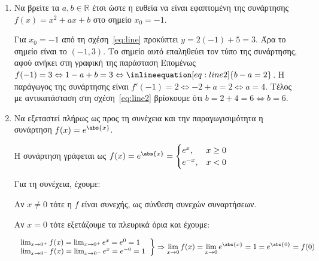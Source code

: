 



\everymath{\displaystyle}



\begin{center}
\end{center}

\vspace{\baselineskip}

\begin{enumerate}
	\item Να βρείτε τα $ a, b \in \mathbb{R} $ έτσι ώστε η ευθεία
		να είναι εφαπτομένη της συνάρτησης $ f(x) = x^{2} + ax + b $ στο
		σημείο $ x_{0} = -1 $. 


		Για $ x_{0} = -1 $ από τη σχέση~\eqref{eq:line}  προκύπτει $ y = 2(-1) + 5 =
		3$. Άρα το σημείο είναι το $ (-1,3) $. Το σημείο αυτό επαληθεύει τον
		τύπο της συνάρτησης, αφού ανήκει στη γραφική της παράσταση
		Επομένως $ f(-1) = 3 \Leftrightarrow 1 - a + b = 3
		\Leftrightarrow \inlineequation[eq:line2]{b - a = 2} $. 
		Η παράγωγος της συνάρτησης είναι $ f'(-1) = 2 \Leftrightarrow -2 + a = 2
		\Leftrightarrow a = 4$. Τέλος με αντικατάσταση στη
		σχέση~\eqref{eq:line2} βρίσκουμε ότι $ b = 2 + 4 = 6 \Leftrightarrow b=6
		$.


	\item Να εξεταστεί πλήρως ως προς τη συνέχεια και την παραγωγισιμότητα η
		συνάρτηση $ f(x) = e^{\abs{x}} $.


		Η συνάρτηση γράφεται ως $ f(x) = e^{\abs{x}} = \begin{cases}
				e^{x}, & x\geq 0 \\
				e^{-x}, & x < 0 
			\end{cases}$	
		
		Για τη συνέχεια, έχουμε:

		Αν $ x\neq 0 $ τότε η $f$ είναι συνεχής, ως σύνθεση συνεχών συναρτήσεων.

		Αν $ x = 0 $ τότε εξετάζουμε τα πλευρικά όρια και έχουμε:

		\[
		\left.
		\begin{tabular}{l}
			$\lim_{x\to 0^{+}} f(x) = \lim_{x\to 0^{+}} e^{x} =  e^{0} = 1$ \\ 
			$\lim_{x\to 0^{-}} f(x) = \lim_{x\to 0^{-}} e^{x} = e^{-0} = 1$
		\end{tabular}
		\right\}
		\Rightarrow \lim_{x\to 0} f(x) = \lim_{x\to 0} e^{\abs{x}} = 1 = e^{\abs{0}} = f(0) 
		\]


\end{enumerate}
